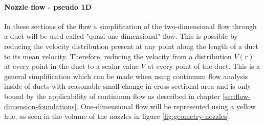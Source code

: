 	\paragraph{Nozzle flow - pseudo 1D}
		In these sections of the flow a simplification of the two-dimensional flow through a duct will be used called "quasi one-dimensional" flow.
		This is possible by reducing the velocity distribution present at any point along the length of a duct to its mean velocity.
		Therefore, reducing the velocity from a distribution $V(r)$ at every point in the duct to a scalar value $V$ at every point of the duct.
		This is a general simplification which can be made when using continuum flow analysis inside of ducts with reasonable small change in cross-sectional area and is only bound by the applicability of continuum flow as described in chapter \ref{sec:flow-dimension-foundations}.
		One-dimensional flow will be represented using a yellow hue, as seen in the volume of the nozzles in figure \ref{fig:geometry-nozzles}.
		\cite{anderson2021modern}
		\newpage

